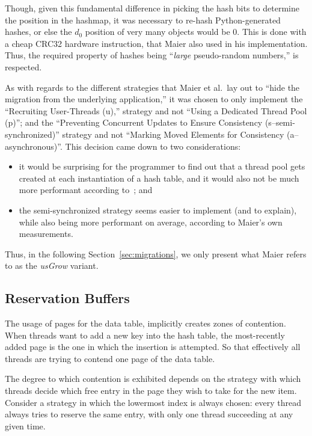 Though, given this fundamental difference in picking the hash bits to determine the position in the hashmap, it was necessary to re-hash Python-generated hashes, or else the $d_0$ position of very many objects would be $0$.
This is done with a cheap CRC32 hardware instruction, that Maier also used in his implementation.
Thus, the required property of hashes being ``\emph{large} pseudo-random numbers,'' is respected.

As with regards to the different strategies that Maier et al.\ lay out to ``hide the migration from the underlying application,'' it was chosen to only implement the ``Recruiting User-Threads (u),'' strategy and not ``Using a Dedicated Thread Pool (p)''; and the ``Preventing Concurrent Updates to Ensure Consistency (s--semi-synchronized)'' strategy and not ``Marking Moved Elements for Consistency (a--asynchronous)''.
This decision came down to two considerations:
\begin{itemize}
	\item it would be surprising for the programmer to find out that a thread pool gets created at each instantiation of a hash table, and it would also not be much more performant according to~\cite[\S8.4, Using Dedicated Growing Threads]{maier}; and
	\item the semi-synchronized strategy seems easier to implement (and to explain), while also being more performant on average, according to Maier's own measurements.
\end{itemize}
Thus, in the following Section~\ref{sec:migrations}, we only present what Maier refers to as the \emph{usGrow} variant.


\subsection{Reservation Buffers}\label{subsec:reservation-buffers}

The usage of pages for the data table, implicitly creates zones of contention.
When threads want to add a new key into the hash table, the most-recently added page is the one in which the insertion is attempted.
So that effectively all threads are trying to contend one page of the data table.

The degree to which contention is exhibited depends on the strategy with which threads decide which free entry in the page they wish to take for the new item.
Consider a strategy in which the lowermost index is always chosen: every thread always tries to reserve the same entry, with only one thread succeeding at any given time.


